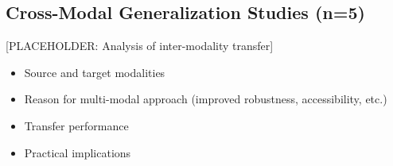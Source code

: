 \subsection{Cross-Modal Generalization Studies (n=5)}

[PLACEHOLDER: Analysis of inter-modality transfer]
\begin{itemize}
    \item Source and target modalities
    \item Reason for multi-modal approach (improved robustness, accessibility, etc.)
    \item Transfer performance
    \item Practical implications
\end{itemize}

